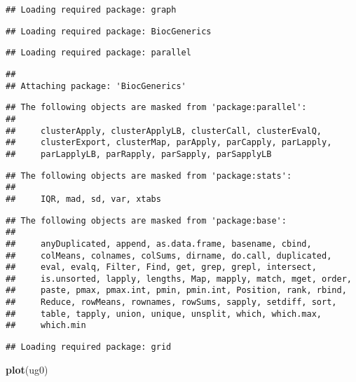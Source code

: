 \documentclass[]{article}
\newenvironment{Shaded}{\begin{snugshade}}{\end{snugshade}}
\newcommand{\KeywordTok}[1]{\textcolor[rgb]{0.13,0.29,0.53}{\textbf{#1}}}
\newcommand{\NormalTok}[1]{#1}
\begin{document}
\begin{verbatim}
## Loading required package: graph
\end{verbatim}

\begin{verbatim}
## Loading required package: BiocGenerics
\end{verbatim}

\begin{verbatim}
## Loading required package: parallel
\end{verbatim}

\begin{verbatim}
## 
## Attaching package: 'BiocGenerics'
\end{verbatim}

\begin{verbatim}
## The following objects are masked from 'package:parallel':
## 
##     clusterApply, clusterApplyLB, clusterCall, clusterEvalQ,
##     clusterExport, clusterMap, parApply, parCapply, parLapply,
##     parLapplyLB, parRapply, parSapply, parSapplyLB
\end{verbatim}

\begin{verbatim}
## The following objects are masked from 'package:stats':
## 
##     IQR, mad, sd, var, xtabs
\end{verbatim}

\begin{verbatim}
## The following objects are masked from 'package:base':
## 
##     anyDuplicated, append, as.data.frame, basename, cbind,
##     colMeans, colnames, colSums, dirname, do.call, duplicated,
##     eval, evalq, Filter, Find, get, grep, grepl, intersect,
##     is.unsorted, lapply, lengths, Map, mapply, match, mget, order,
##     paste, pmax, pmax.int, pmin, pmin.int, Position, rank, rbind,
##     Reduce, rowMeans, rownames, rowSums, sapply, setdiff, sort,
##     table, tapply, union, unique, unsplit, which, which.max,
##     which.min
\end{verbatim}

\begin{verbatim}
## Loading required package: grid
\end{verbatim}

\begin{Shaded}
\begin{Highlighting}[]
\KeywordTok{plot}\NormalTok{(ug0)}
\end{Highlighting}
\end{Shaded}
\end{document}
